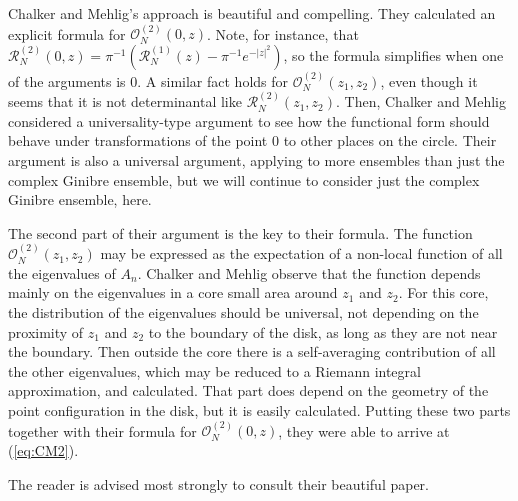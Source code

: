 \documentclass[12pt]{report}
\theoremstyle{definition}
\begin{document}
Chalker and Mehlig's approach is beautiful and compelling.
They calculated an explicit formula for $\mathcal{O}_N^{(2)}(0,z)$.
Note, for instance, that $\mathcal{R}_N^{(2)}(0,z) = \pi^{-1} (\mathcal{R}_N^{(1)}(z)-\pi^{-1}e^{-|z|^2})$,
so the formula simplifies when one of the arguments is $0$.
A similar fact holds for $\mathcal{O}_N^{(2)}(z_1,z_2)$, even though it seems that it is not determinantal
like $\mathcal{R}_N^{(2)}(z_1,z_2)$.
Then, Chalker and Mehlig considered a universality-type argument to see how the functional form should behave under transformations
of the point $0$ to other places on the circle.
Their argument is also a universal argument, applying to more ensembles than just the complex Ginibre ensemble,
but we will continue to consider just the complex Ginibre ensemble, here.

The second part of their argument is the key to their formula. 
The function $\mathcal{O}_N^{(2)}(z_1,z_2)$ may be expressed as the expectation
of a non-local function of all the eigenvalues of $A_n$.
Chalker and Mehlig observe that the function depends mainly on the eigenvalues in a core small
area around $z_1$ and $z_2$.
For this core, the distribution of the eigenvalues should be universal, not depending on the proximity
of $z_1$ and $z_2$ to the boundary of the disk, as long as they are not near the boundary.
Then outside the core there is a self-averaging contribution of all the other eigenvalues, which
may be reduced to a Riemann integral approximation, and calculated.
That part does depend on the geometry of the point configuration in the disk, but it is easily calculated.
Putting these two parts together with their formula for $\mathcal{O}_N^{(2)}(0,z)$,
they were able to arrive at (\ref{eq:CM2}).

The reader is advised most strongly to consult their beautiful paper.
\end{document}
